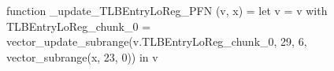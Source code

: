 function _update_TLBEntryLoReg_PFN (v, x) = let v = { v with TLBEntryLoReg_chunk_0 = vector_update_subrange(v.TLBEntryLoReg_chunk_0, 29, 6, vector_subrange(x, 23, 0)) } in v
